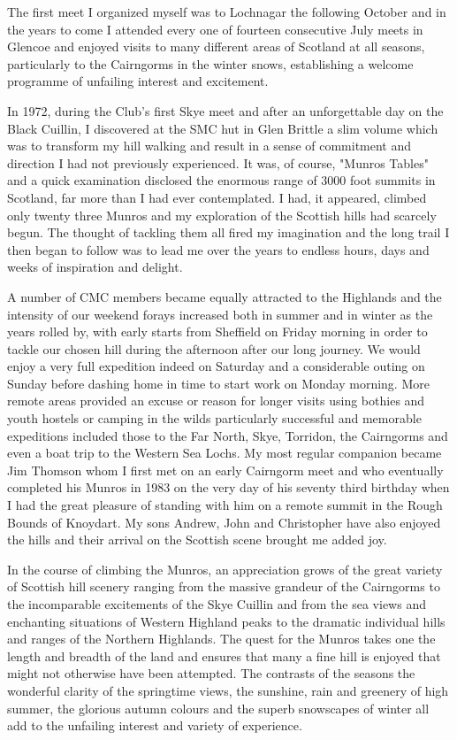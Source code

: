 \documentclass[a5paper,openany,font 10pt]{scrbook}
\begin{document}
The first meet I organized myself was to Lochnagar the
following October and in the years to come I attended every one
of fourteen consecutive July meets in Glencoe and enjoyed visits
to many different areas of Scotland at all seasons, particularly
to the Cairngorms in the winter snows, establishing a welcome
programme of unfailing interest and excitement.

In 1972, during the Club's first Skye meet and after an
unforgettable day on the Black Cuillin, I discovered at the SMC
hut in Glen Brittle a slim volume which was to transform my hill
walking and result in a sense of commitment and direction I had
not previously experienced. It was, of course, "Munros Tables"
and a quick examination disclosed the enormous range of 3000 foot
summits in Scotland, far more than I had ever contemplated. I
had, it appeared, climbed only twenty three Munros and my
exploration of the Scottish hills had scarcely begun. The thought
of tackling them all fired my imagination and the long trail I
then began to follow was to lead me over the years to endless
hours, days and weeks of inspiration and delight.

A number of CMC members became equally attracted to the
Highlands and the intensity of our weekend forays increased both
in summer and in winter as the years rolled by, with early starts
from Sheffield on Friday morning in order to tackle our chosen
hill during the afternoon after our long journey. We would enjoy
a very full expedition indeed on Saturday and a considerable
outing on Sunday before dashing home in time to start work on
Monday morning. More remote areas provided an excuse or reason
for longer visits using bothies and youth hostels or camping in
the wilds  particularly successful and memorable expeditions
included those to the Far North, Skye, Torridon, the Cairngorms
and even a boat trip to the Western Sea Lochs. My most regular
companion became Jim Thomson whom I first met on an early
Cairngorm meet and who eventually completed his Munros in 1983 on
the very day of his seventy third birthday when I had the great
pleasure of standing with him on a remote summit in the Rough
Bounds of Knoydart. My sons Andrew, John and Christopher have
also enjoyed the hills and their arrival on the Scottish scene
brought me added joy.

In the course of climbing the Munros, an appreciation grows
of the great variety of Scottish hill scenery ranging from the
massive grandeur of the Cairngorms to the incomparable
excitements of the Skye Cuillin and from the sea views and
enchanting situations of Western Highland peaks to the dramatic
individual hills and ranges of the Northern Highlands. The quest
for the Munros takes one the length and breadth of the land and
ensures that many a fine hill is enjoyed that might not otherwise
have been attempted. The contrasts of the seasons   the wonderful
clarity of the springtime views, the sunshine, rain and greenery
of high summer, the glorious autumn colours and the superb
snowscapes of winter   all add to the unfailing interest and
variety of experience.
\end{document}
